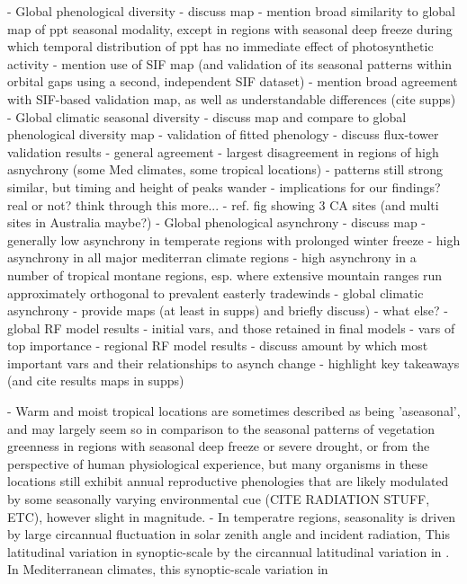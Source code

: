 \documentclass[9pt,twocolumn,twoside,lineno]{pnas-new}
\begin{document}
- Global phenological diversity
    - discuss map
    - mention broad similarity to global map of ppt seasonal modality, except in regions with seasonal deep freeze during which temporal distribution of ppt has no immediate effect of photosynthetic activity
    - mention use of SIF map (and validation of its seasonal patterns within orbital gaps using a second, independent SIF dataset)
    - mention broad agreement with SIF-based validation map, as well as understandable differences (cite supps)
- Global climatic seasonal diversity
    - discuss map and compare to global phenological diversity map
- validation of fitted phenology
    - discuss flux-tower validation results
    - general agreement
    - largest disagreement in regions of high asnychrony (some Med climates, some tropical locations)
        - patterns still strong similar, but timing and height of peaks wander
        - implications for our findings? real or not? think through this more...
        - ref. fig showing 3 CA sites (and multi sites in Australia maybe?)
- Global phenological asynchrony
    - discuss map
    - generally low asynchrony in temperate regions with prolonged winter freeze
    - high asynchrony in all major mediterran climate regions
    - high asynchrony in a number of tropical montane regions, esp. where extensive mountain ranges run approximately orthogonal to prevalent easterly tradewinds
- global climatic asynchrony
    - provide maps (at least in supps) and briefly discuss)
    - what else?
- global RF model results
    - initial vars, and those retained in final models
    - vars of top importance
- regional RF model results
    - discuss amount by which most important vars and their relationships to asynch change
    - highlight key takeaways (and cite results maps in supps)
    

- Warm and moist tropical locations are sometimes described as being 'aseasonal', and may largely seem so in comparison to the seasonal patterns of vegetation greenness in regions with seasonal deep freeze or severe drought, or from the perspective of human physiological experience, but many organisms in these locations still exhibit annual reproductive phenologies that are likely modulated by some seasonally varying environmental cue (CITE RADIATION STUFF, ETC), however slight in magnitude.
- In temperatre regions, seasonality is driven by large circannual fluctuation in solar zenith angle and incident radiation, This latitudinal variation in synoptic-scale  by the circannual latitudinal variation in . In Mediterranean climates, this synoptic-scale variation in 
\end{document}
